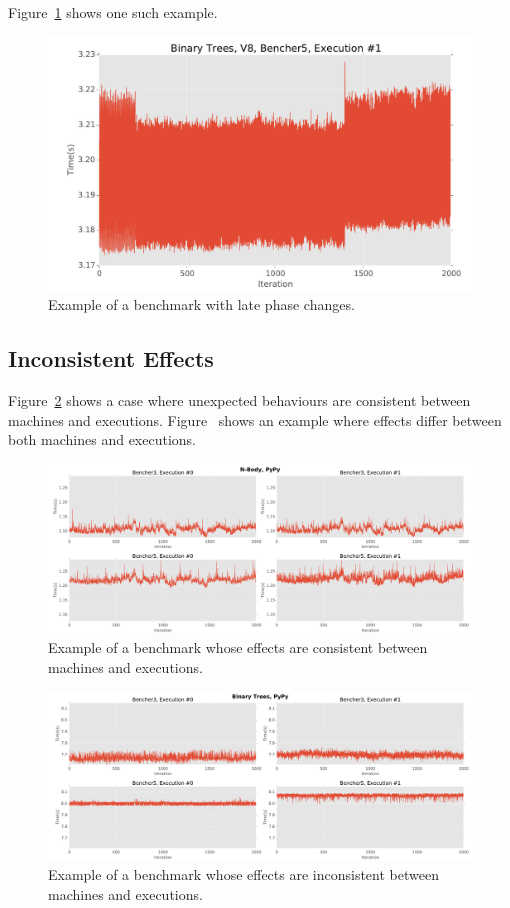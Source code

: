 \documentclass[10pt,preprint]{sigplanconf}
\begin{document}
Figure~\ref{fig:examples:late1} shows one such example.

\begin{figure}[h!]
\centering
\includegraphics[width=.46\textwidth]{examples/late1}
\caption{Example of a benchmark with late phase changes.}
\label{fig:examples:late1}
\end{figure}

\subsection{Inconsistent Effects}
\label{sub:inconsistent}


Figure~\ref{fig:examples:consistent_weirdness1} shows a case where
unexpected behaviours are consistent between machines and executions.
Figure~\label{fig:examples:inconsistent_weirdness1} shows an example where
effects differ between both machines and executions.

\begin{figure}[h!]
\centering
\includegraphics[width=\textwidth]{examples/consistent_weirdness1}
\caption{Example of a benchmark whose effects are consistent between machines and executions.}
\label{fig:examples:consistent_weirdness1}
\end{figure}

\begin{figure}[h!]
\centering
\includegraphics[width=\textwidth]{examples/inconsistent_weirdness1}
\caption{Example of a benchmark whose effects are inconsistent between machines and executions.}
\label{fig:examples:inconsistent_weirdness1}
\end{figure}
\end{document}
